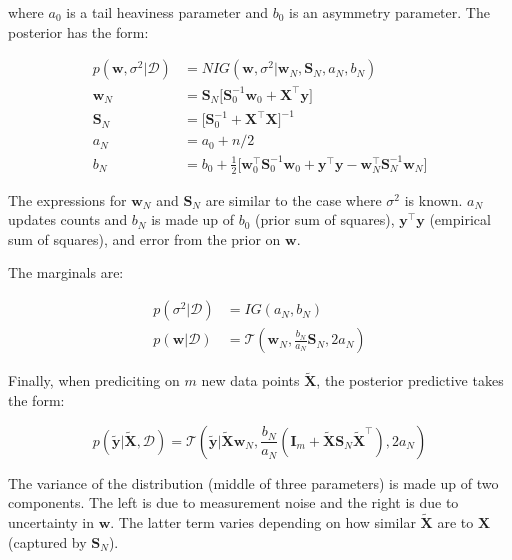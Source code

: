 \documentclass{harvardml}
\theoremstyle{definition}
\theoremstyle{plain}
\renewcommand{\v}[1]{\mathbf{#1}}
\begin{document}
\noindent where $a_0$ is a tail heaviness parameter and $b_0$ is an
asymmetry parameter. The posterior has the form:

\begin{align*}
    p(\v w, \sigma^2 | \mathcal{D}) &= 
    NIG(\v w, \sigma^2 | \v w_N, \v S_N, a_N, b_N)\\
    \v w_N &= \v S_N \big[\v S_0^{-1} \v w_0 + \v X^\top \v y \big]\\
    \v S_N &= \big[\v S_0^{-1} + \v X^\top \v X \big]^{-1}\\
    a_N &= a_0 + n/2\\
    b_N &= b_0 + \frac{1}{2} \big[\v w_0^\top \v S_0^{-1} \v w_0 +
                    \v y^\top \v y - \v w_N^\top \v S_N^{-1} \v w_N \big]
\end{align*}

\noindent The expressions for $\v w_N$ and $\v S_N$ are similar to 
the case where $\sigma^2$ is known. $a_N$ updates counts and $b_N$ 
is made up of $b_0$ (prior sum of squares), $\v y^\top \v y$
(empirical sum of squares), and error from the prior on $\v w$.

\noindent The marginals are:

\begin{align*}
    p(\sigma^2 | \mathcal{D}) &= IG(a_N,b_N)\\
    p(\v w | \mathcal{D}) &= \mathcal{T}(\v w_N, 
                             \frac{b_N}{a_N} \v S_N,
                             2a_N)
\end{align*}

\noindent Finally, when prediciting on $m$ new data points $\tilde{\v X}$,
the posterior predictive takes the form:

$$ p(\tilde{\v y} | \tilde{\v X}, \mathcal{D}) =
   \mathcal{T}(\tilde{\v y} | \tilde{\v X}\v w_N,
              \frac{b_N}{a_N}(\v I_m + \tilde{\v X} \v S_N \tilde{\v X}^\top),
              2a_N)$$

\noindent The variance of the distribution (middle of three parameters)
is made up of two components. The left is due to measurement noise
and the right is due to uncertainty in $\v w$. The latter term varies depending
on how similar $\tilde{\v X}$ are to $\v X$ (captured by $\v S_N$).
\end{document}
